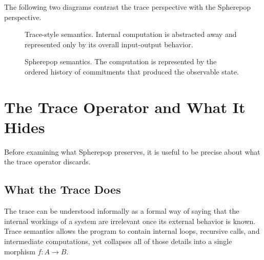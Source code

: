 \documentclass[12pt]{article}
\newcommand{\Seq}[1]{\left[#1\right]}
\begin{document}
The following two diagrams contrast the trace perspective with the Spherepop perspective.

\begin{figure}[h]
\centering
{}
\caption{Trace-style semantics. Internal computation is abstracted away
and represented only by its overall input-output behavior.}
\end{figure}

\begin{figure}[h]
\centering
{}
\caption{Spherepop semantics. The computation is represented by the
ordered history of commitments that produced the observable state.}
\end{figure}

\section{The Trace Operator and What It Hides}
\label{sec:traces}

Before examining what Spherepop preserves, it is useful to be precise about what the trace operator discards.

\subsection{What the Trace Does}

The trace can be understood informally as a formal way of saying that the internal workings of a system are irrelevant once its external behavior is known. Trace semantics allows the program to contain internal loops, recursive calls, and intermediate computations, yet collapses all of those details into a single morphism $f : A \to B$.
\end{document}
